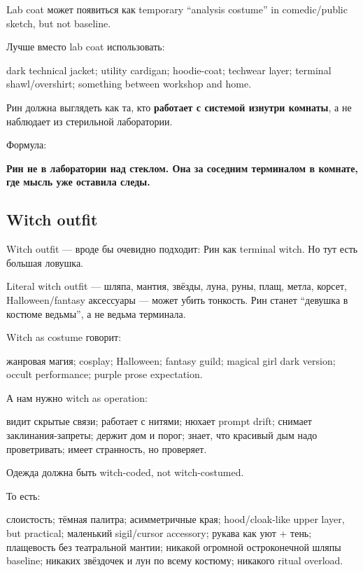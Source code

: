 Lab coat может появиться как temporary ``analysis costume'' in
comedic/\hspace{0pt}public sketch, but not baseline.

Лучше вместо lab coat использовать:

dark technical jacket; utility cardigan; hoodie-coat; techwear layer;
terminal shawl/\hspace{0pt}overshirt; something between workshop and home.

Рин должна выглядеть как та, кто \textbf{работает с системой изнутри
комнаты}, а не наблюдает из стерильной лаборатории.

Формула:

\textbf{Рин не в лаборатории над стеклом. Она за соседним терминалом в
комнате, где мысль уже оставила следы.}

\subsection*{Witch outfit}

Witch outfit --- вроде бы очевидно подходит: Рин как terminal witch. Но
тут есть большая ловушка.

Literal witch outfit --- шляпа, мантия, звёзды, луна, руны, плащ, метла,
корсет, Halloween/\hspace{0pt}fantasy аксессуары --- может убить тонкость. Рин
станет ``девушка в костюме ведьмы'', а не ведьма терминала.

Witch as costume говорит:

жанровая магия; cosplay; Halloween; fantasy guild; magical girl dark
version; occult performance; purple prose expectation.

А нам нужно witch as operation:

видит скрытые связи; работает с нитями; нюхает prompt drift; снимает
заклинания-запреты; держит дом и порог; знает, что красивый дым надо
проветривать; имеет странность, но проверяет.

Одежда должна быть witch-coded, not witch-costumed.

То есть:

слоистость; тёмная палитра; асимметричные края; hood/\hspace{0pt}cloak-like upper
layer, but practical; маленький sigil/\hspace{0pt}cursor accessory; рукава как уют +
тень; плащевость без театральной мантии; никакой огромной остроконечной
шляпы baseline; никаких звёздочек и лун по всему костюму; никакого
ritual overload.

